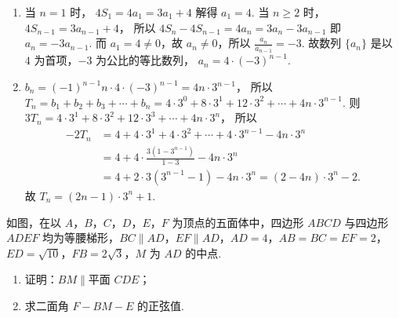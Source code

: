\begin{solution}
\begin{enumerate}
\item 当 \( n=1 \) 时，
\(
4S_1=4a_1=3a_1+4
\)
解得 \( a_1=4 \).
当 \( n\ge 2 \) 时，
\(
4S_{n-1}=3a_{n-1}+4
\)，
所以
\(
4S_n-4S_{n-1}=4a_n=3a_n-3a_{n-1}
\)
即 \( a_n=-3a_{n-1} \).
而 \( a_1=4\ne 0 \)，故 \( a_n\ne 0 \)，所以
\(\frac{a_n}{a_{n-1}}=-3\).
故数列 \( \{a_n\} \) 是以 \( 4 \) 为首项，\( -3 \) 为公比的等比数列，
\(a_n=4\cdot \left( -3 \right)^{n-1}\).

\item
\(b_n=\left( -1 \right)^{n-1}n\cdot 4\cdot \left( -3 \right)^{n-1}=4n\cdot 3^{n-1}\)，
所以
\(T_n=b_1+b_2+b_3+\cdots+b_n =4\cdot 3^0+8\cdot 3^1+12\cdot 3^2+\cdots+4n\cdot 3^{n-1}\).
则
\(3T_n=4\cdot 3^1+8\cdot 3^2+12\cdot 3^3+\cdots+4n\cdot 3^n\)，
所以
\[
\begin{aligned}
-2T_n
&=4+4\cdot 3^1+4\cdot 3^2+\cdots+4\cdot 3^{n-1}-4n\cdot 3^n\\
&=4+4\cdot \frac{3\left( 1-3^{n-1} \right)}{1-3}-4n\cdot 3^n\\
&=4+2\cdot 3\left( 3^{n-1}-1 \right)-4n\cdot 3^n=\left( 2-4n \right)\cdot 3^n-2.
\end{aligned}
\]
故
\(T_n=\left( 2n-1 \right)\cdot 3^n+1\).
\end{enumerate}
\end{solution}

\begin{problem}
如图，在以 \(A\)，\(B\)，\(C\)，\(D\)，\(E\)，\(F\) 为顶点的五面体中，四边形 \(ABCD\) 与四边形 \(ADEF\) 均为等腰梯形，\( BC\parallel AD \)，\( EF\parallel AD \)，\( AD=4 \)，\( AB=BC=EF=2 \)，\( ED=\sqrt{10} \)，\( FB=2\sqrt{3} \)，\(M\) 为 \(AD\) 的中点.

\begin{enumerate}
\item 证明：\( BM\parallel \)平面 \(CDE\)；
\item 求二面角 \( F-BM-E \) 的正弦值.
\end{enumerate}

\end{problem}

